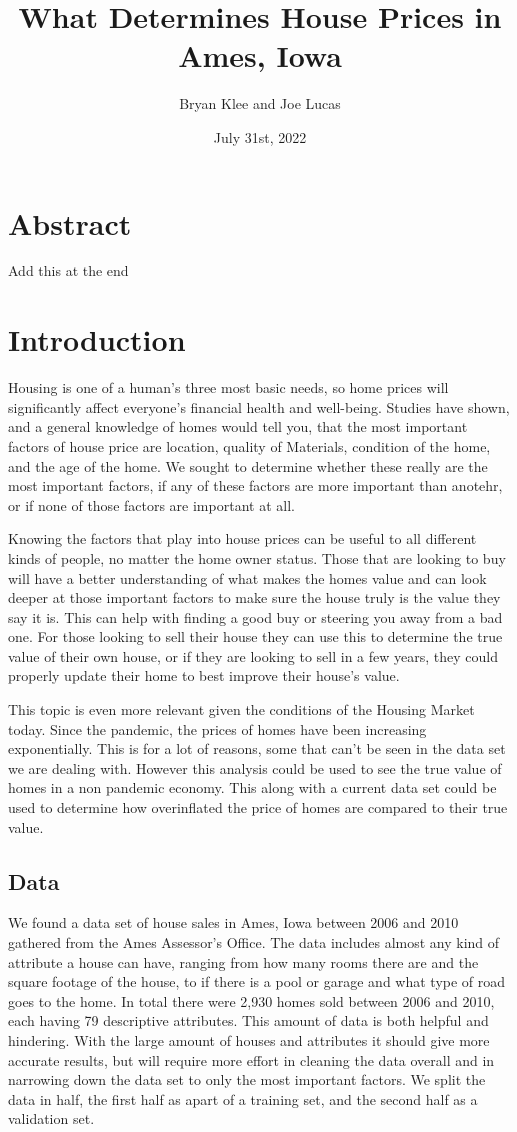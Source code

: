 \documentclass{article}
\title{What Determines House Prices in Ames, Iowa}
\author{Bryan Klee and Joe Lucas}
\date{July 31st, 2022}
\begin{document}
	\maketitle
	\section{Abstract}
	Add this at the end
	
	\section{Introduction}
	Housing is one of a human's three most basic needs, so home prices will significantly affect everyone's financial health and well-being. Studies have shown, and a general knowledge of homes would tell you, that the most important factors of house price are location, quality of Materials, condition of the home, and the age of the home. We sought to determine whether these really are the most important factors, if any of these factors are more important than anotehr, or if none of those factors are important at all. 
	
	Knowing the factors that play into house prices can be useful to all different kinds of people, no matter the home owner status. Those that are looking to buy will have a better understanding of what makes the homes value and can look deeper at those important factors to make sure the house truly is the value they say it is. This can help with finding a good buy or steering you away from a bad one. For those looking to sell their house they can use this to determine the true value of their own house, or if they are looking to sell in a few years, they could properly update their home to best improve their house's value.
	
	This topic is even more relevant given the conditions of the Housing Market today. Since the pandemic, the prices of homes have been increasing exponentially. This is for a lot of reasons, some that can't be seen in the data set we are dealing with. However this analysis could be used to see the true value of homes in a non pandemic economy. This along with a current data set could be used to determine how overinflated the price of homes are compared to their true value. 
	
	\subsection{Data}
	We found a data set of house sales in Ames, Iowa between 2006 and 2010 gathered from the Ames Assessor's Office. The data includes almost any kind of attribute a house can have, ranging from how many rooms there are and the square footage of the house, to if there is a pool or garage and what type of road goes to the home. In total there were 2,930 homes sold between 2006 and 2010, each having 79 descriptive attributes. This amount of data is both helpful and hindering. With the large amount of houses and attributes it should give more accurate results, but will require more effort in cleaning the data overall and in narrowing down the data set to only the most important factors. We split the data in half, the first half as apart of a training set, and the second half as a validation set. 
	
\end{document}
